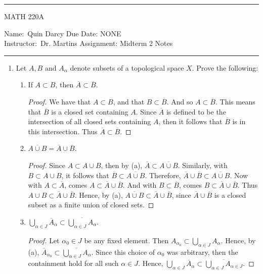 \documentclass[12pt]{article}
\theoremstyle{definition}
\begin{document}
 \thispagestyle{empty}\hrule

    \begin{center}
        \vspace{.4cm} { \large MATH 220A}
    \end{center}
    {Name:\ Quin Darcy \hspace{\fill} Due Date: NONE \\
    { Instructor:}\ Dr. Martins \hspace{\fill} Assignment:
    Midterm 2 Notes \\ \hrule}
    \begin{enumerate}
        \item Let $A, B$ and $A_{\alpha}$ denote subsets of a topological space $X$. Prove the following:
        \begin{enumerate}
            \item If $A\subset B$, then $\overline{A}\subset \overline{B}$.
                \begin{proof}
                    We have that $A\subset B$, and that $B\subset \overline{B}$. And so $A\subset\overline{B}$. This means that $\overline{B}$ is a closed set containing $A$. Since $\overline{A}$ is defined to be the intersection of all closed sets containing $A$, then it follows that $\overline{B}$ is in this intersection. Thus $\overline{A}\subset\overline{B}$.
                \end{proof}
            \item $\overline{A\cup B}=\overline{A}\cup\overline{B}$.
                \begin{proof}
                    Since $A\subset A\cup B$, then by (a), $\overline{A}\subset\overline{A\cup B}$. Similarly, with $B\subset A\cup B$, it follows that $\overline{B}\subset\overline{A\cup B}$. Therefore, $\overline{A}\cup\overline{B}\subset\overline{A\cup B}$. Now with $A\subset \overline{A}$, comes $A\subset\overline{A}\cup\overline{B}$. And with $B\subset\overline{B}$, comes $B\subset\overline{A}\cup\overline{B}$. Thus $A\cup B\subset\overline{A}\cup\overline{B}$. Hence, by (a), $\overline{A\cup B}\subset\overline{A}\cup\overline{B}$, since $\overline{A}\cup\overline{B}$ is a closed subset as a finite union of closed sets.
                \end{proof}
            \item $\bigcup_{\alpha\in J}\overline{A}_{\alpha}\subset\overline{\bigcup_{\alpha\in J}A_{\alpha}}$.
                \begin{proof}
                    Let $\alpha_0\in J$ be any fixed element. Then $A_{\alpha_0}\subset\bigcup_{\alpha\in J}A_{\alpha}$. Hence, by (a), $\overline{A}_{\alpha_0}\subset\overline{\bigcup_{\alpha\in J}A_{\alpha}}$. Since this choice of $\alpha_0$ was arbitrary, then the containment hold for all such $\alpha\in J$. Hence, $\bigcup_{\alpha\in J}\overline{A}_{\alpha}\subset\overline{\bigcup_{\alpha\in J}A_{\alpha\in J}}$.

\end{proof}
\end{enumerate}
\end{enumerate}
\end{document}
